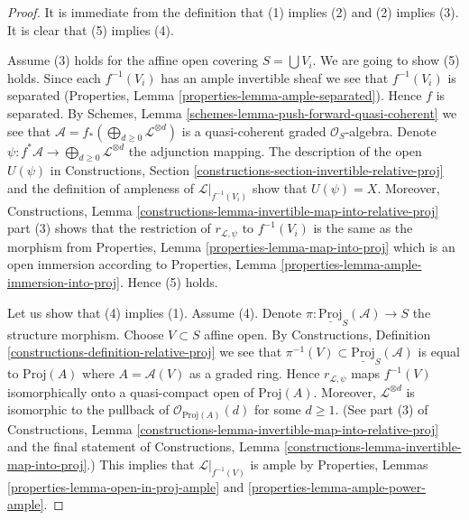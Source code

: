 \begin{proof}
It is immediate from the definition that (1) implies (2) and
(2) implies (3). It is clear that (5) implies (4).

\medskip\noindent
Assume (3) holds for the affine open covering $S = \bigcup V_i$.
We are going to show (5) holds.
Since each $f^{-1}(V_i)$ has an ample invertible sheaf we see
that $f^{-1}(V_i)$ is separated
(Properties, Lemma \ref{properties-lemma-ample-separated}).
Hence $f$ is separated. By
Schemes, Lemma \ref{schemes-lemma-push-forward-quasi-coherent}
we see that $\mathcal{A} = f_*(\bigoplus_{d \geq 0} \mathcal{L}^{\otimes d})$
is a quasi-coherent graded $\mathcal{O}_S$-algebra.
Denote $\psi : f^*\mathcal{A} \to \bigoplus_{d \geq 0} \mathcal{L}^{\otimes d}$
the adjunction mapping.
The description of the open $U(\psi)$ in
Constructions, Section
\ref{constructions-section-invertible-relative-proj}
and the definition of ampleness
of $\mathcal{L}|_{f^{-1}(V_i)}$ show that $U(\psi) = X$.
Moreover, Constructions,
Lemma \ref{constructions-lemma-invertible-map-into-relative-proj} part (3)
shows that the restriction of $r_{\mathcal{L}, \psi}$ to
$f^{-1}(V_i)$ is the same as the morphism from
Properties, Lemma \ref{properties-lemma-map-into-proj}
which is an open immersion according to
Properties, Lemma \ref{properties-lemma-ample-immersion-into-proj}.
Hence (5) holds.

\medskip\noindent
Let us show that (4) implies (1). Assume (4).
Denote $\pi : \underline{\text{Proj}}_S(\mathcal{A}) \to S$
the structure morphism. Choose $V \subset S$ affine open. By
Constructions, Definition \ref{constructions-definition-relative-proj}
we see that $\pi^{-1}(V) \subset \underline{\text{Proj}}_S(\mathcal{A})$
is equal to $\text{Proj}(A)$ where $A = \mathcal{A}(V)$
as a graded ring. Hence $r_{\mathcal{L}, \psi}$ maps
$f^{-1}(V)$ isomorphically onto
a quasi-compact open of $\text{Proj}(A)$.
Moreover, $\mathcal{L}^{\otimes d}$ is isomorphic to the pullback of
$\mathcal{O}_{\text{Proj}(A)}(d)$ for some $d \geq 1$.
(See part (3) of Constructions,
Lemma \ref{constructions-lemma-invertible-map-into-relative-proj}
and the final statement of Constructions,
Lemma \ref{constructions-lemma-invertible-map-into-proj}.)
This implies that $\mathcal{L}|_{f^{-1}(V)}$ is ample by
Properties, Lemmas \ref{properties-lemma-open-in-proj-ample}
and \ref{properties-lemma-ample-power-ample}.


\end{proof}
